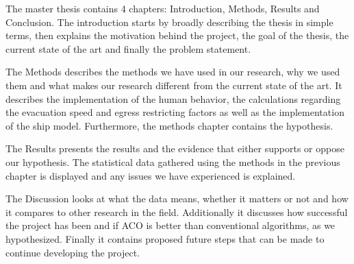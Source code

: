 The master thesis contains 4 chapters: Introduction, Methods, Results and Conclusion.               
The introduction starts by broadly describing the thesis in simple terms, then explains the motivation behind the project,
the goal of the thesis, the current state of the art and finally the problem statement. 

The Methods describes the methods we have used in our research, why we used them and what makes
our research different from the current state of the art. It describes the implementation of the human behavior,
the calculations regarding the evacuation speed and egress restricting factors as well as the implementation of the 
ship model. Furthermore, the methods chapter contains the hypothesis.

The Results presents the results and the evidence that either supports or oppose our hypothesis. The
statistical data gathered using the methods in the previous chapter is displayed and any issues we have experienced
is explained.

The Discussion looks at what the data means, whether it matters or not and how it compares to other research in the field.
Additionally it discusses how successful the project has been and if ACO is better than conventional algorithms, as we hypothesized.
Finally it contains proposed future steps that can be made to continue developing the project.
